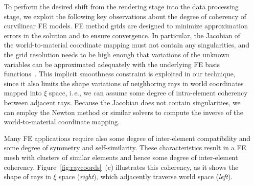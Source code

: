 \documentclass[journal]{vgtc}                %
\begin{document}
To perform the desired shift from the rendering stage into the data processing stage, we exploit the following key observations about the degree of coherency of curvilinear FE models. FE method grids are designed to minimize approximation errors in the solution and to ensure convergence. In particular, the Jacobian of the world-to-material coordinate mapping must not contain any singularities, and the grid resolution needs to be high enough that variations of the unknown variables can be approximated adequately with the underlying FE basis functions~\cite{knupp07meshquality}. This implicit smoothness constraint is exploited in our technique, since it also limits the shape variations of neighboring rays in world coordinates mapped into $\xi$ space, i.\,e., we can assume some degree of intra-element coherency between adjacent rays. Because the Jacobian does not contain singularities, we can employ the Newton method or similar solvers to compute the inverse of the world-to-material coordinate mapping.

Many FE applications require also some degree of inter-element compatibility and some degree of symmetry and self-similarity. These characteristics result in a FE mesh with clusters of similar elements and hence some degree of inter-element coherency. Figure~\ref{fig:raycoords}~(c) illustrates this coherency, as it shows the shape of rays in $\xi$ space ({\it right}), which adjacently traverse world space ({\it left}).
\end{document}
